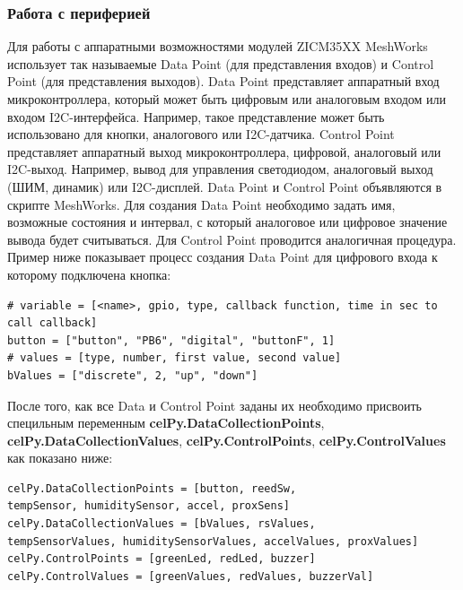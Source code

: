 \documentclass[12pt]{article}
\begin{document}
\subsubsection{Работа с периферией}
Для работы с аппаратными возможностями модулей ZICM35XX MeshWorks использует так 
называемые Data Point (для представления входов) и Control Point (для представления 
выходов).\newline
Data Point представляет аппаратный вход микроконтроллера, который может быть цифровым 
или аналоговым входом или входом I2C-интерфейса. Например, такое представление 
может быть использовано для кнопки, аналогового или I2C-датчика.\newline
Control Point представляет аппаратный выход микроконтроллера, цифровой, аналоговый 
или I2C-выход. Например, вывод для управления светодиодом, аналоговый выход 
(ШИМ, динамик) или I2C-дисплей.
Data Point и Control Point объявляются в скрипте MeshWorks.\newline
Для создания Data Point необходимо задать имя, возможные состояния и интервал, 
с который аналоговое или цифровое значение вывода  будет считываться. Для Control 
Point проводится аналогичная процедура.\newline
Пример ниже показывает процесс создания Data Point для цифрового входа к которому 
подключена кнопка:
\begin{verbatim}
# variable = [<name>, gpio, type, callback function, time in sec to call callback]
button = ["button", "PB6", "digital", "buttonF", 1]
# values = [type, number, first value, second value]
bValues = ["discrete", 2, "up", "down"]
\end{verbatim}
После того, как все Data и Control Point заданы их необходимо присвоить специльным 
переменным \textbf{celPy.DataCollectionPoints}, \textbf{celPy.DataCollectionValues},
\textbf{celPy.ControlPoints}, \textbf{celPy.ControlValues} как показано ниже:
\begin{verbatim}
celPy.DataCollectionPoints = [button, reedSw,
tempSensor, humiditySensor, accel, proxSens]
celPy.DataCollectionValues = [bValues, rsValues,
tempSensorValues, humiditySensorValues, accelValues, proxValues]
celPy.ControlPoints = [greenLed, redLed, buzzer]
celPy.ControlValues = [greenValues, redValues, buzzerVal]
\end{verbatim}
\end{document}
